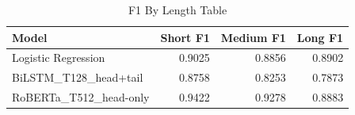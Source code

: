 \begin{table}
\caption{F1 By Length Table}
\label{tab:f1_by_length_table}
\begin{tabular}{lrrr}
\toprule
Model & Short F1 & Medium F1 & Long F1 \\
\midrule
Logistic Regression & 0.9025 & 0.8856 & 0.8902 \\
BiLSTM_T128_head+tail & 0.8758 & 0.8253 & 0.7873 \\
RoBERTa_T512_head-only & 0.9422 & 0.9278 & 0.8883 \\
\bottomrule
\end{tabular}
\end{table}
